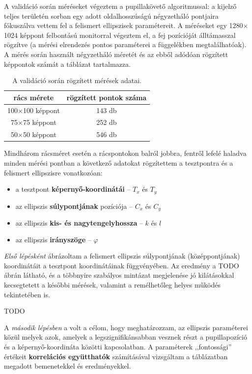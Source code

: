 A validáció során méréseket végeztem a pupillakövető algoritmussal: a kijelző teljes területén sorban egy adott oldalhosszúságú négyzetháló pontjaira fókuszálva vettem fel a felismert ellipszisek paramétereit. A méréseket egy 1280$\times$1024 képpont felbontású monitorral végeztem el, a fej pozícióját álltámasszal rögzítve (a mérési elrendezés pontos paraméterei a  függelékben megtalálhatóak). A mérés során használt négyzetháló méretét és az ebből adódóan rögzített képpontok számát a  táblázat tartalmazza.

\begin{table}[ht]
	\centering
	\caption{A validáció során rögzített mérések adatai.} \label{tab:meresi_pontok}
	\begin{tabular}{ c | c }
	rács mérete & rögzített pontok száma \\ \hline \hline
	100$\times$100 képpont & 143 db \\
	75$\times$75 képpont & 252 db \\
	50$\times$50 képpont & 546 db \\
	\end{tabular}
\end{table}

Mindhárom rácsméret esetén a rácspontokon balról jobbra, fentről lefelé haladva minden mérési pontban a következő adatokat rögzítettem a tesztpontra és a felismert ellipszisre vonatkozóan:

\begin{itemize}
  \item a tesztpont \textbf{képernyő-koordinátái} -- $T_x$ és $T_y$
  \item az ellipszis \textbf{súlypontjának} pozíciója -- $C_x$ és $C_y$
  \item az ellipszis \textbf{kis- és nagytengelyhossza} -- $k$ és $l$
  \item az ellipszis \textbf{irányszöge} -- $\varphi$
\end{itemize}

\emph{Első lépésként} ábrázoltam a felismert ellipszis súlypontjának (középpontjának) koordinátáit a tesztpont koordinátáinak függvényében. Az eredmény a TODO ábrán látható, és a többnyire szabályos mintázat megjelenése jó kilátásokkal kecsegtetett a későbbi mérések, valamint a remélhetőleg helyes működés tekintetében is.

TODO

A \emph{második lépésben} a volt a célom, hogy meghatározzam, az ellipszis paraméterei közül melyek azok, amelyek a legszignifikánsabban vesznek részt a pupillapozíció és a képernyő-koordináta közötti kapcsolatban. A paraméterek ,,fontossági'' értékeit \textbf{korrelációs együtthatók} számításával vizsgáltam a  táblázatban megadott bemenetekkel és eredményekkel. 

